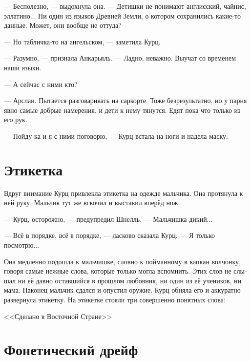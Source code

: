 \documentclass[a4paper,10pt,fleqn]{book}\usepackage{polyglossia}\setdefaultlanguage[babelshorthands=true]{russian}\setotherlanguage{english}\defaultfontfeatures{Ligatures=TeX,Mapping=tex-text}\usepackage{xcolor}\newcommand{\ml}[3]{#2}
\begin{document}
--- Бесполезно, --- выдохнула она.
\ml{$0$}
{--- Детишки не понимают англисский, чайнис, эллатино...}
{``The children don't speak Englis, Chainis, Ellatino ....}
Ни один из языков Древней Земли, о котором сохранились какие-то данные.
Может, они вообще не оттуда?

\ml{$0$}
{--- Но табличка-то на ангельском, --- заметила Курц.}
{``But that plate is written in Engels,'' Kurz noted.}

\ml{$0$}
{--- Разумно, --- признала Анкарьяль.}
{``Makes sense,'' Angaralle admitted.}
--- Ладно, неважно.
Выучат со временем наши языки.

--- А сейчас с ними кто?

\ml{$0$}
{--- Арслан.}
{``Arslan.}
\ml{$0$}
{Пытается разговаривать на саркорте.}
{Trying to speak Sarqort to them.}
\ml{$0$}
{Тоже безрезультатно, но у парня явно самые добрые намерения, и дети к нему тянутся.}
{Result is the same, but the guy apparently has the best intentions for them, and the children reciprocate.}
\ml{$0$}
{Едят пока что только из его рук.}
{Thus far, they take food from his hands only.''}

--- Пойду-ка и я с ними поговорю, --- Курц встала на ноги и надела маску.

\section{Этикетка}

Вдруг внимание Курц привлекла этикетка на одежде мальчика.
Она протянула к ней руку.
Мальчик тут же вскочил и выставил вперёд нож.

--- Курц, осторожно, --- предупредил Шнелль.
--- Мальчишка дикий...

--- Всё в порядке, всё в порядке, --- ласково сказала Курц.
--- Я только посмотрю...

Она медленно подошла к мальчишке, словно к пойманному в капкан волчонку, говоря самые нежные слова, которые только могла вспомнить.
Этих слов не слышал ни её давно оставшийся в прошлом любовник, ни один из её учеников, ни мама.
Наконец мальчик сдался и опустил оружие.
Курц обняла его и аккуратно развернула этикетку.
На этикетке стояли три совершенно понятных слова:

\ml{$0$}
{<<Сделано в Восточной Стране>>}
{\textsc{Made in Eastern Realm}}

\section{Фонетический дрейф}
\end{document}
